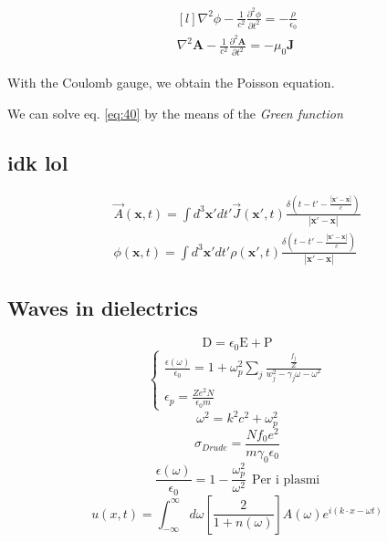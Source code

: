\documentclass[a4paper, twocolumn]{article}
\begin{document}
\begin{align}
  \begin{aligned}[l]
      \label{eq:40}
      \nabla^2\phi -\frac{1}{c^2}\frac{\partial^2\phi}{\partial t^2}=-\frac{\rho}{\epsilon_0} \\
      \nabla^2\mathbf{A}-\frac{1}{c^2}\frac{\partial^2\mathbf{A}}{\partial t^2}= -\mu_0 \mathbf{J} 
  \end{aligned}
\end{align}

With the Coulomb gauge, we obtain the Poisson equation.

We can solve eq. \ref{eq:40} by the means of the \emph{Green function}
\subsection{idk lol}
\begin{align}
	\vec{A}(\mathbf{x},t)=\int d^3\mathbf{x'}dt'\vec{J}(\mathbf{x'},t) \frac{\delta (t-t'- \frac{\left|\mathbf{x'}-\mathbf{x}\right|}{c})}{\left|\mathbf{x'}-\mathbf{x}\right|} \tag{$\alpha$ costanti se S.I.} \\
		\phi (\mathbf{x},t)=\int d^3\mathbf{x'}dt' \rho(\mathbf{x'},t) \frac{\delta (t-t'- \frac{\left|\mathbf{x'}-\mathbf{x}\right|}{c})}{\left|\mathbf{x'}-\mathbf{x}\right|} \tag{$\alpha$ altre costanti se S.I.}
\end{align}
\subsection{Waves in dielectrics}
\begin{equation}
	\mathrm{D}=\epsilon_0 \mathrm{E} + \mathrm{P}
\end{equation}
\begin{equation}
\begin{cases}
\frac{\epsilon(\omega)}{\epsilon_0} =1 + \omega_p ^2 \sum_j \frac{\frac{f_j}{Z}}{w_j^2 - \gamma_j \omega - \omega^2} \\
\epsilon_p=\frac{Z e^2 N}{\epsilon_0 m}
\end{cases}
\end{equation}
\begin{equation}
	\omega^2=k^2c^2+\omega_p^2
\end{equation}
\begin{equation}
	\sigma_{Drude}=\frac{N f_0 e^2}{m \gamma_0 \epsilon_0}
\end{equation}
\begin{equation}
	\frac{\epsilon(\omega)}{\epsilon_0} = 1 -\frac{\omega_p^2}{\omega^2} ~~\text{Per i plasmi}
\end{equation}
\begin{equation}
	u(x,t)=\int_{-\infty}^{\infty}d\omega \left[\frac{2}{1+n(\omega)}\right]A(\omega) e^{i(k \cdot x-\omega t)} \tag{onda piana incidente in mezzo con $n(\omega)$}
\end{equation}
\end{document}
